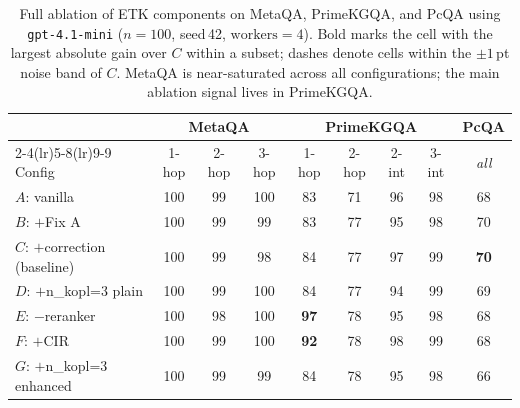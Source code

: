 %
%
\begin{table}[t]
\centering
\small
\caption{Full ablation of ETK components on MetaQA, PrimeKGQA, and PcQA using \texttt{gpt-4.1-mini} ($n=100$, seed\,42, $\mathrm{workers}=4$). Bold marks the cell with the largest absolute gain over $C$ within a subset; dashes denote cells within the $\pm 1$\,pt noise band of $C$. MetaQA is near-saturated across all configurations; the main ablation signal lives in PrimeKGQA.}
\label{tab:ablation_gpt41mini}
\begin{tabular}{l ccc cccc c}
\toprule
 & \multicolumn{3}{c}{\textbf{MetaQA}} & \multicolumn{4}{c}{\textbf{PrimeKGQA}} & \textbf{PcQA} \\
\cmidrule(lr){2-4}\cmidrule(lr){5-8}\cmidrule(lr){9-9}
Config & 1-hop & 2-hop & 3-hop & 1-hop & 2-hop & 2-int & 3-int & \textit{all} \\
\midrule
$A$: vanilla                 & 100 & 99 & 100 & 83 & 71 & 96 & 98 & 68 \\
$B$: $+$Fix A                & 100 & 99 & 99  & 83 & 77 & 95 & 98 & 70 \\
$C$: $+$correction (baseline) & 100 & 99 & 98  & 84 & 77 & 97 & 99 & \textbf{70} \\
\midrule
$D$: $+$n\_kopl{=}3 plain     & 100 & 99 & 100 & 84 & 77 & 94 & 99 & 69 \\
$E$: $-$reranker             & 100 & 98 & 100 & \textbf{97} & 78 & 95 & 98 & 68 \\
$F$: $+$CIR                  & 100 & 99 & 100 & \textbf{92} & 78 & 98 & 99 & 68 \\
$G$: $+$n\_kopl{=}3 enhanced  & 100 & 99 & 99  & 84 & 78 & 95 & 98 & 66 \\
\bottomrule
\end{tabular}
\end{table}

